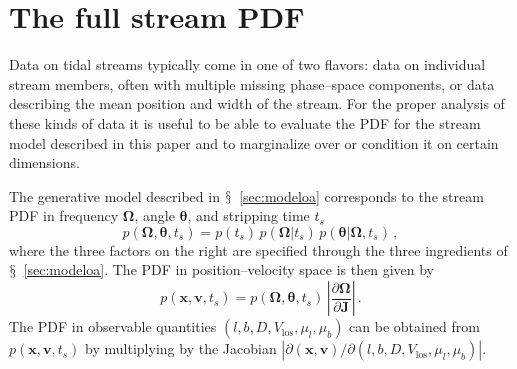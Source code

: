 \documentclass[12pt,preprint]{aastex}
\newcommand{\sectionname}{$\mathsection$}
\renewcommand{\vec}[1]{\ensuremath{\mathbf{#1}}}
\newcommand{\vecx}{\ensuremath{\vec{x}}}
\newcommand{\vecv}{\ensuremath{\vec{v}}}
\newcommand{\vecj}{\ensuremath{\vec{J}}}
\newcommand{\veco}{\ensuremath{\vec{\Omega}}}
\newcommand{\veca}{\ensuremath{\boldsymbol\theta}}
\newcommand{\vlos}{\ensuremath{V_{\mathrm{los}}}}
\newcommand{\pmll}{\ensuremath{\mu_l}}
\newcommand{\pmbb}{\ensuremath{\mu_b}}
\begin{document}
\section{The full stream PDF}\label{sec:pdf}

Data on tidal streams typically come in one of two flavors: data on
individual stream members, often with multiple missing phase--space
components, or data describing the mean position and width of the
stream. For the proper analysis of these kinds of data it is useful to
be able to evaluate the PDF for the stream model described in this
paper and to marginalize over or condition it on certain dimensions.

The generative model described in \sectionname~\ref{sec:modeloa}
corresponds to the stream PDF in frequency $\veco$, angle $\veca$, and
stripping time $t_s$
\begin{equation}
  p(\veco,\veca,t_s) = p(t_s)\,p(\veco|t_s)\,p(\veca|\veco,t_s)\,,
\end{equation}
where the three factors on the right are specified through the three
ingredients of \sectionname~\ref{sec:modeloa}. The PDF in
position--velocity space is then given by
\begin{equation}\label{eq:pxvt}
  p(\vecx,\vecv,t_s) = p(\veco,\veca,t_s)\,\left|\frac{\partial
    \veco}{\partial \vecj}\right|\,.
\end{equation}
The PDF in observable quantities $(l,b,D,\vlos,\pmll,\pmbb)$ can be
obtained from $p(\vecx,\vecv,t_s)$ by multiplying by the Jacobian
$\left|\partial(\vecx,\vecv)/\partial(l,b,D,\vlos,\pmll,\pmbb)\right|$. 
\end{document}
